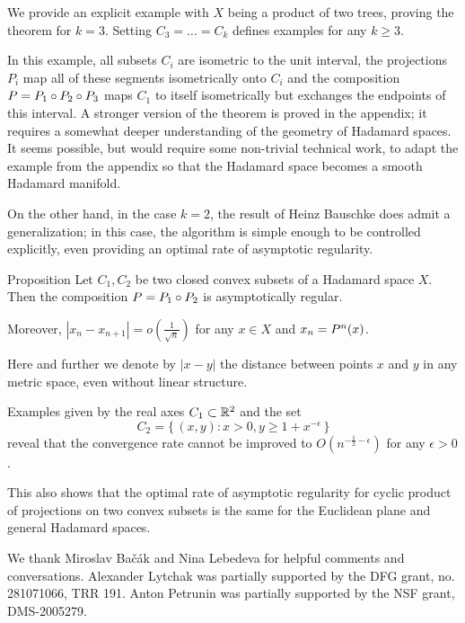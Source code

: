 \documentclass[a4paper,10pt]{article}
\begin{document}

We provide an explicit example with $X$ being a product of two trees, proving the theorem for $k=3$.
Setting $C_3=\dots=C_k$ defines examples for any $k\geq 3$.

In this example, all subsets $C_i$ are isometric to the unit interval, the projections $P_i$ map all of these segments isometrically onto $C_i$ and the composition $P\z=P_1\circ P_2\circ P_3$ maps $C_1$ to itself isometrically but exchanges the endpoints
of this interval.
A stronger version of the theorem is proved in the appendix;
it requires a somewhat deeper understanding of the geometry of Hadamard spaces.
It seems possible, but would require some non-trivial technical work, to adapt the example
from the appendix so that the Hadamard space becomes a smooth Hadamard  manifold.


On the other hand,  in the case $k=2$,  the result of Heinz Bauschke \cite{bauschke}  does admit a generalization;  in this case, the algorithm is simple enough to be controlled explicitly, even providing an optimal rate of asymptotic regularity.


\begin{thm}{Proposition} \label{prop}
Let $C_1,C_2$ be two closed convex subsets of a Hadamard space $X$.
Then the composition $P\z=  P_1\circ P_2$ is asymptotically  regular.

Moreover, $|x_n-x_{n+1}| =o (\frac  {1} {\sqrt n})$ for any  $x\in X$ and $x_n \z= P^n (x)$.
\end{thm}

Here and further we denote by $|x-y|$ the distance between points $x$ and $y$ in any metric space, even without linear structure.

Examples given by the real axes $C_1 \subset \mathbb{R}^2$ and the set
\[C_2  = \{\,(x,y):x>0, y \geq 1+ x^{ -\epsilon}\,\}\]
reveal that the convergence rate cannot be improved to $O (n^{-\frac 1 2  -\epsilon})$ for any $\epsilon >0$. 

This also shows that the optimal rate of asymptotic regularity for cyclic product of projections on two convex subsets is the same for the Euclidean plane and general Hadamard spaces. 

We thank Miroslav Bačák and Nina Lebedeva for helpful comments and conversations.
Alexander Lytchak was partially supported by the DFG grant, no. 281071066, TRR 191.
Anton Petrunin was partially supported by the NSF grant, DMS-2005279.
\end{document}
